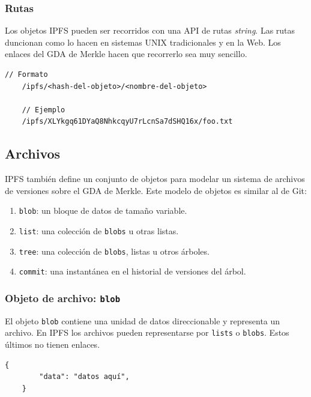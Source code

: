 \documentclass[12pt]{article} %
\begin{document}
\subsubsection{Rutas} %
\label{ssub:rutas}

Los objetos IPFS pueden ser recorridos con una API de rutas \textit{string}. Las rutas duncionan como lo hacen en sistemas UNIX tradicionales y en la Web. Los enlaces del GDA de Merkle hacen que recorrerlo sea muy sencillo.

\begin{lstlisting}[caption={Rutas en IPFS.}]
	// Formato
	/ipfs/<hash-del-objeto>/<nombre-del-objeto>

	// Ejemplo
	/ipfs/XLYkgq61DYaQ8NhkcqyU7rLcnSa7dSHQ16x/foo.txt
\end{lstlisting}



\subsection{Archivos} %
\label{sub:archivos}

IPFS también define un conjunto de objetos para modelar un sistema de archivos de versiones sobre el GDA de Merkle. Este modelo de objetos es similar al de Git:
\begin{enumerate}
	\item \texttt{blob}: un bloque de datos de tamaño variable.
	\item \texttt{list}: una colección de \texttt{blobs} u otras listas.
	\item \texttt{tree}: una colección de \texttt{blobs}, listas u otros árboles.
	\item \texttt{commit}: una instantánea en el historial de versiones del árbol.
\end{enumerate}

\subsubsection{Objeto de archivo: \texttt{blob}} %
\label{ssub:objeto_de_archivo_blob}

El objeto \texttt{blob} contiene una unidad de datos direccionable y representa un archivo. En IPFS los archivos pueden representarse por \texttt{lists} o \texttt{blobs}. Estos últimos no tienen enlaces.

\begin{lstlisting}[caption={Estructura JSON de un \texttt{blob}.}]
	{
		"data": "datos aquí",
	}
\end{lstlisting}
\end{document}

